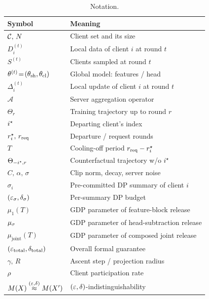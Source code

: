 \begin{table}[t]
\centering
\scriptsize
\setlength{\tabcolsep}{3pt}
\begin{tabular}{ll}
\toprule
Symbol & Meaning \\
\midrule
$\mathcal{C},\, N$              & Client set and its size \\
$D_i^{(t)}$                    & Local data of client $i$ at round $t$ \\
$S^{(t)}$                      & Clients sampled at round $t$ \\
$\theta^{(t)} \!=\! (\theta_\mathrm{sh}, \theta_\mathrm{cl})$ & Global model: features / head \\
$\Delta_i^{(t)}$               & Local update of client $i$ at round $t$ \\
$\mathcal{A}$                  & Server aggregation operator \\
$\Theta_r$                     & Training trajectory up to round $r$ \\
$i^{\star}$                      & Departing client's index \\
$r_i^{\star},\, r_\mathrm{req}$  & Departure / request rounds \\
$T$                            & Cooling-off period $r_\mathrm{req} - r_i^{\star}$ \\
$\Theta_{-i^{\star}, r}$         & Counterfactual trajectory w/o $i^{\star}$ \\
$C,\, \alpha,\, \sigma$        & Clip norm, decay, server noise \\
$\sigma_i$                     & Pre-committed DP summary of client $i$ \\
$(\varepsilon_\sigma, \delta_\sigma)$ & Per-summary DP budget \\
$\mu_1(T)$                     & GDP parameter of feature-block release \\
$\mu_\sigma$                 & GDP parameter of head-subtraction release \\
$\mu_\mathrm{joint}(T)$        & GDP parameter of composed joint release \\
$(\varepsilon_\mathrm{total}, \delta_\mathrm{total})$ & Overall formal guarantee \\
$\gamma,\, R$                  & Ascent step / projection radius \\
$\rho$                         & Client participation rate \\
$M(X) \stackrel{(\varepsilon,\delta)}{\approx} M(X')$           & $(\varepsilon, \delta)$-indistinguishability \\
\bottomrule
\end{tabular}
\caption{Notation.}
\label{tab:notations}
\end{table}

